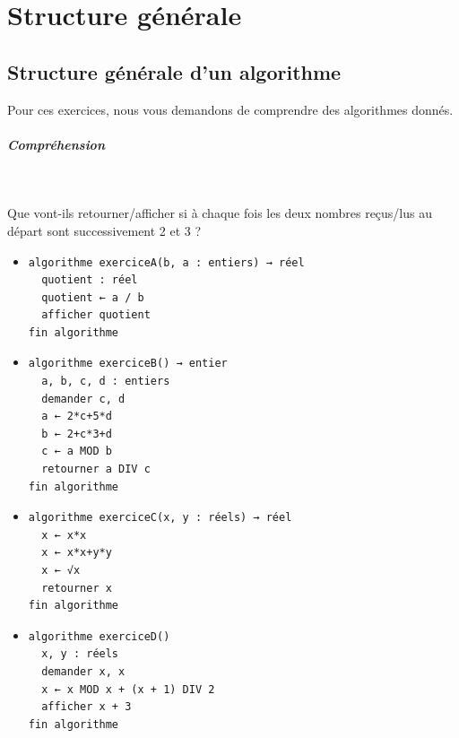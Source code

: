 \documentclass[11pt,a4paper]{article}
\begin{document}
        \section{Structure g\'en\'erale}\subsection{Structure g\'en\'erale d'un algorithme}
          Pour ces exercices, nous vous demandons de comprendre des algorithmes donn\'es. 
          
			
		\subparagraph{Compr\'ehension} 
		
                \textcolor{white}{.} \par
            
							  Que vont-ils retourner/afficher si \`a chaque fois les deux nombres re\c cus/lus au d\'epart sont successivement 2 et 3 ?
							
					\begin{itemize}
				
			\item \begin{verbatim}
algorithme exerciceA(b, a : entiers) → réel
  quotient : réel
  quotient ← a / b
  afficher quotient
fin algorithme
				\end{verbatim} \textcolor{gray}{\underline{\hspace*{2em}}} 
			\item \begin{verbatim}
algorithme exerciceB() → entier
  a, b, c, d : entiers
  demander c, d
  a ← 2*c+5*d
  b ← 2+c*3+d
  c ← a MOD b
  retourner a DIV c
fin algorithme
				\end{verbatim} \textcolor{gray}{\underline{\hspace*{1em}}} 
			\item \begin{verbatim}
algorithme exerciceC(x, y : réels) → réel
  x ← x*x 
  x ← x*x+y*y 
  x ← √x
  retourner x
fin algorithme
				\end{verbatim} \textcolor{gray}{\underline{\hspace*{1em}}} 
			\item \begin{verbatim}
algorithme exerciceD()
  x, y : réels
  demander x, x
  x ← x MOD x + (x + 1) DIV 2
  afficher x + 3
fin algorithme
				\end{verbatim} \textcolor{gray}{\underline{\hspace*{1em}}} 
					\end{itemize}
				
\end{document}
